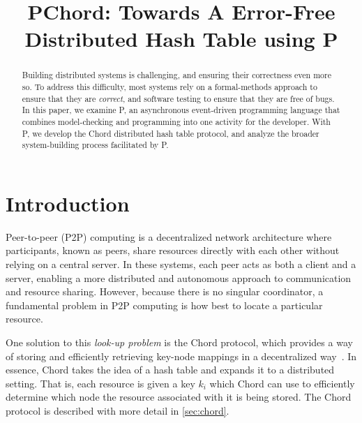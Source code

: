 \documentclass[conference]{IEEEtran}
\begin{document}
\title{
	PChord: Towards A Error-Free Distributed Hash Table using P
}

\author{
	 \and
}

\maketitle

\begin{abstract}
	Building distributed systems is challenging, and ensuring their correctness even more so. To address this difficulty, most systems rely on a formal-methods approach to ensure that they are \textit{correct}, and software testing to ensure that they are free of bugs. In this paper, we examine P, an asynchronous event-driven programming language that combines model-checking and programming into one activity for the developer. With P, we develop the Chord distributed hash table protocol, and analyze the broader system-building process facilitated by P.
\end{abstract}

\section{Introduction}
Peer-to-peer (P2P) computing is a decentralized network architecture where participants, known as peers, share resources directly with each other without relying on a central server. In these systems, each peer acts as both a client and a server, enabling a more distributed and autonomous approach to communication and resource sharing. However, because there is no singular coordinator, a fundamental problem in P2P computing is how best to locate a particular resource.

One solution to this \textit{look-up problem} is the Chord protocol, which provides a way of storing and efficiently retrieving key-node mappings in a decentralized way~\cite{stoica_chord_2001,stoica_chord_2003,liben-nowell_analysis_2002}. In essence, Chord takes the idea of a hash table and expands it to a distributed setting. That is, each resource is given a key $k_i$ which Chord can use to efficiently determine which node the resource associated with it is being stored. The Chord protocol is described with more detail in \autoref{sec:chord}.
\end{document}
